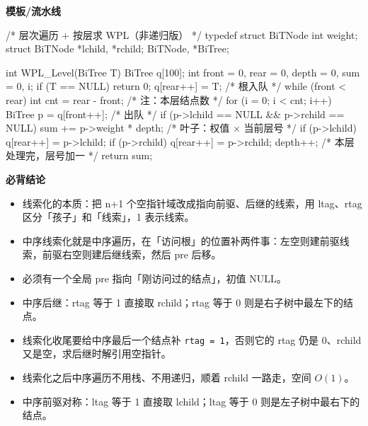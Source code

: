 \documentclass[10pt,a4paper]{ctexart}
\begin{document}
\textbf{模板/流水线}

\begin{codebox}
/* 层次遍历 + 按层求 WPL（非递归版） */
typedef struct BiTNode {
    int weight;
    struct BiTNode *lchild, *rchild;
} BiTNode, *BiTree;

int WPL_Level(BiTree T) {
    BiTree q[100];
    int front = 0, rear = 0, depth = 0, sum = 0, i;
    if (T == NULL) return 0;
    q[rear++] = T;                          /* 根入队 */
    while (front < rear) {
        int cnt = rear - front;             /* 注：本层结点数 */
        for (i = 0; i < cnt; i++) {
            BiTree p = q[front++];          /* 出队 */
            if (p->lchild == NULL && p->rchild == NULL)
                sum += p->weight * depth;   /* 叶子：权值 × 当前层号 */
            if (p->lchild) q[rear++] = p->lchild;
            if (p->rchild) q[rear++] = p->rchild;
        }
        depth++;                            /* 本层处理完，层号加一 */
    }
    return sum;
}
\end{codebox}





\textbf{必背结论}

\begin{itemize}

\item 线索化的本质：把 n+1 个空指针域改成指向前驱、后继的线索，用 ltag、rtag 区分「孩子」和「线索」，1 表示线索。

\item 中序线索化就是中序遍历，在「访问根」的位置补两件事：左空则建前驱线索，前驱右空则建后继线索，然后 pre 后移。

\item 必须有一个全局 pre 指向「刚访问过的结点」，初值 NULL。

\item 中序后继：rtag 等于 1 直接取 rchild；rtag 等于 0 则是右子树中最左下的结点。

\item 线索化收尾要给中序最后一个结点补 \texttt{rtag = 1}，否则它的 rtag 仍是 0、rchild 又是空，求后继时解引用空指针。

\item 线索化之后中序遍历不用栈、不用递归，顺着 rchild 一路走，空间 $O(1)$。

\item 中序前驱对称：ltag 等于 1 直接取 lchild；ltag 等于 0 则是左子树中最右下的结点。

\end{itemize}
\end{document}
